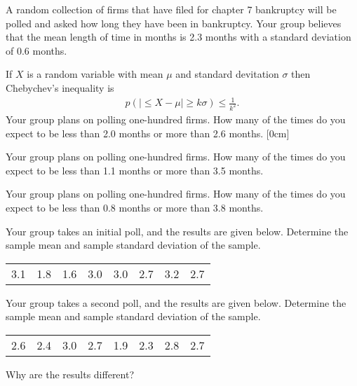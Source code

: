 \begin{problem}
\item A random collection of firms that have filed for chapter 7 bankruptcy will
  be polled and asked how long they have been in bankruptcy. Your
  group believes that the mean length of time in months is 2.3 months
  with a standard deviation of 0.6 months.

  \begin{subproblem}
  \item If $X$ is a random variable with mean $\mu$ and standard
    devitation $\sigma$ then Chebychev's inequality is
    \begin{eqnarray*}
      p\left( \left| \leq X - \mu \right| \geq k \sigma \right) \leq \frac{1}{k^2}.
    \end{eqnarray*}
    Your group plans on polling one-hundred firms. How many of the
    times do you expect to be less than 2.0 months or more than 2.6
    months.  [0cm]

    \vfill

  \item Your group plans on polling one-hundred firms. How many of the
    times do you expect to be less than 1.1 months or more than 3.5 months.

    \vfill

  \item Your group plans on polling one-hundred firms. How many of the
    times do you expect to be less than 0.8 months or more than 3.8
    months.

    \vfill

    \clearpage

  \item Your group takes an initial poll, and the results are given
    below. Determine the sample mean and sample standard deviation of
    the sample. \\
    \begin{tabular}{rrrrrrrr}
      3.1 & 1.8 & 1.6 & 3.0 & 3.0 & 2.7 & 3.2 & 2.7
    \end{tabular}

    \vfill

  \item Your group takes a second poll, and the results are given
    below. Determine the sample mean and sample standard deviation of
    the sample. \\
    \begin{tabular}{rrrrrrrr}
      2.6 & 2.4 & 3.0 & 2.7 & 1.9 & 2.3 & 2.8 & 2.7
    \end{tabular}

    \vfill

  \item Why are the results different?

    \vspace{4em}

  \end{subproblem}

\end{problem}

